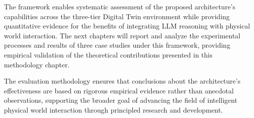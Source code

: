The framework enables systematic assessment of the proposed architecture's capabilities across the three-tier Digital Twin environment while providing quantitative evidence for the benefits of integrating LLM reasoning with physical world interaction. The next chapters will report and analyze the experimental processes and results of three case studies under this framework, providing empirical validation of the theoretical contributions presented in this methodology chapter.

The evaluation methodology ensures that conclusions about the architecture's effectiveness are based on rigorous empirical evidence rather than anecdotal observations, supporting the broader goal of advancing the field of intelligent physical world interaction through principled research and development.